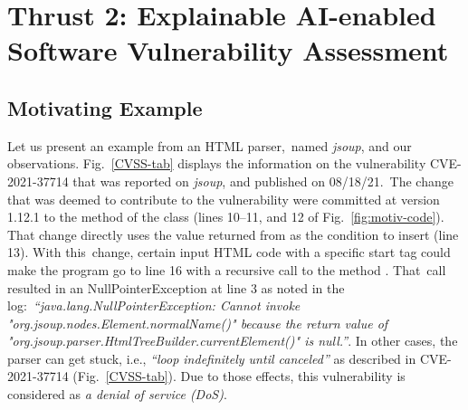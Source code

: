 \section{Thrust 2: Explainable AI-enabled Software Vulnerability Assessment}
\label{sec:thrust2}

\subsection{Motivating Example}
\label{exe:sec}






Let us present an example from an HTML parser,~named {\em
  jsoup}, and our observations.
Fig.~\ref{CVSS-tab} displays the information on the vulnerability
CVE-2021-37714 that was reported on {\em jsoup}, and published on
08/18/21.~The change that was deemed to contribute to the
vulnerability were committed at version 1.12.1 to the method
 of the
 class (lines 10--11, and 12 of
Fig.~\ref{fig:motiv-code}). That change directly uses the value
returned from  as the condition to
insert  (line 13). With this~change, certain input HTML
code with a specific start tag could make the program go to line 16
with a recursive call to the method . That~call
resulted in an NullPointerException at line 3 as noted in the
log:~{\em ``java.\-lang.\-Null\-Pointer\-Ex\-ception: Cannot invoke
  "org.\-jsoup.\-nodes.\-Element.\-normalName()" because the return
  value of
  "org.\-jsoup.\-parser.\-HtmlTree\-Builder.\-current\-Element()" is
  null.''}. In other cases, the parser can get stuck, i.e., {\em
  ``loop indefinitely until canceled''} as described in CVE-2021-37714 (Fig.~\ref{CVSS-tab}). Due
to those effects, this vulnerability is considered as {\em a denial of
  service (DoS)}.

